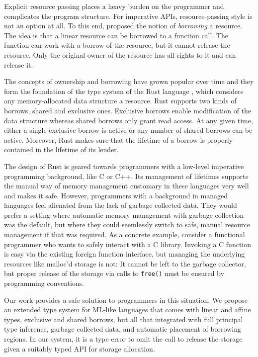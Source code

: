 Explicit resource passing places a heavy burden on the programmer and
complicates the program structure. For imperative APIs,
resource-passing style is not an option at all. To this end,
\citet{DBLP:conf/popl/BoylandR05}  proposed the notion of
\emph{borrowing} a resource. The idea is that a linear resource can be
borrowed to a function call. The function can work with a borrow of
the resource, but it cannot release the resource. Only the original
owner of the resource has all rights to it and can release it.

The concepts of ownership and borrowing have grown popular over time
and they form the foundation of the type system of the Rust language
\cite{rust}, which considers any memory-allocated data structure a
resource. Rust supports two kinds of borrows,
shared and exclusive ones.
Exclusive borrows enable modification of the data structure
whereas shared borrows only grant read access.
At any given time, either a single exclusive borrow is active or 
any number of shared borrows can be active.
Moreover, Rust makes sure that the lifetime of a
borrow is properly contained in the lifetime of its lender.

The design of Rust is geared towards programmers with a low-level
imperative programming background, like C or C++. Its management of
lifetimes supports the manual way of memory management customary in
these languages very well and makes it safe. However, programmers with
a background in managed languages feel alienated from the lack of garbage
collected data. They would prefer a setting where automatic memory
management with garbage collection was the default, but where they
could seemlessly switch to safe, manual resource management if that
was required.
%
As a concrete example, consider a functional programmer who wants to
safely interact with a C library. Invoking a C function is easy via
the existing foreign function interface, but managing the underlying
resources like malloc'd storage is not: It cannot be left to the
garbage collector, but proper release of the storage via calls to \texttt{free()} must be
ensured by programming conventions.

Our work provides a safe solution to programmers in this situation. We
propose an extended type system for ML-like languages that comes with
linear and affine types, exclusive and shared borrows, but all that
integrated with full principal type inference, garbage collected data, and
automatic placement of borrowing regions.
In our system, it is a type error to omit the call to release the
storage given a suitably typed API for storage allocation.

